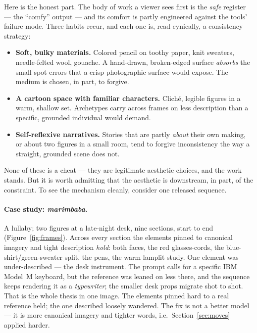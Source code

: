\documentclass[10pt,letterpaper,twocolumn]{article}
\begin{document}
Here is the honest part. The body of work a viewer sees first is the
\emph{safe} register --- the ``comfy'' output --- and its comfort is
partly engineered against the tools' failure mode. Three habits recur, and
each one is, read cynically, a consistency strategy:

\begin{itemize}
  \item \textbf{Soft, bulky materials.} Colored pencil on toothy paper,
  knit sweaters, needle-felted wool, gouache. A hand-drawn, broken-edged
  surface \emph{absorbs} the small spot errors that a crisp photographic
  surface would expose. The medium is chosen, in part, to forgive.
  \item \textbf{A cartoon space with familiar characters.} Cliché, legible
  figures in a warm, shallow set. Archetypes carry across frames on less
  description than a specific, grounded individual would demand.
  \item \textbf{Self-reflexive narratives.} Stories that are partly
  \emph{about} their own making, or about two figures in a small room, tend
  to forgive inconsistency the way a straight, grounded scene does not.
\end{itemize}

None of these is a cheat --- they are legitimate aesthetic choices, and the
work stands. But it is worth admitting that the aesthetic is downstream, in
part, of the constraint. To see the mechanism cleanly, consider one
released sequence.

\paragraph{Case study: \emph{marimbaba}.} A lullaby; two figures at a
late-night desk, nine sections, start to end (Figure~\ref{fig:frames}).
Across every section the elements pinned to canonical imagery and tight
description \emph{hold}: both faces, the red glasses-cords, the
blue-shirt/green-sweater split, the pens, the warm lamplit study. One
element was under-described --- the desk instrument. The prompt calls for a
specific IBM Model~M keyboard, but the reference was leaned on less there,
and the sequence keeps rendering it as a \emph{typewriter}; the smaller
desk props migrate shot to shot. That is the whole thesis in one image. The
elements pinned hard to a real reference held; the one described loosely
wandered. The fix is not a better model --- it is more canonical imagery and
tighter words, i.e.\ Section~\ref{sec:moves} applied harder.
\end{document}
